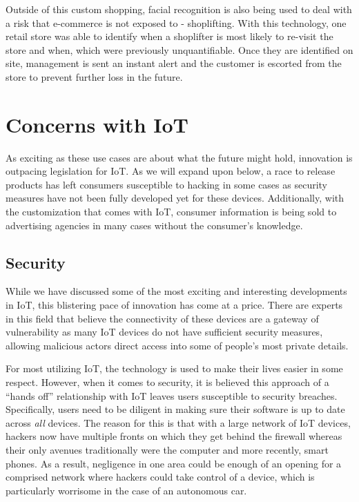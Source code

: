 \documentclass[sigconf]{acmart}
\begin{document}
Outside of this custom shopping, facial recognition is also being used to deal with a risk that e-commerce is not exposed to - shoplifting. With this technology, one retail store was able to identify when a shoplifter is most likely to re-visit the store and when, which were previously unquantifiable. Once they are identified on site, management is sent an instant alert and the customer is escorted from the store to prevent further loss in the future. 


\section{Concerns with IoT}
As exciting as these use cases are about what the future might hold, innovation is outpacing legislation for IoT. As we will expand upon below, a race to release products has left consumers susceptible to hacking in some cases as security measures have not been fully developed yet for these devices. Additionally, with the customization that comes with IoT, consumer information is being sold to advertising agencies in many cases without the consumer's knowledge. 

\subsection{Security}
While we have discussed some of the most exciting and interesting developments in IoT, this blistering pace of innovation has come at a price. There are experts in this field that believe the connectivity of these devices are a gateway of vulnerability as many IoT devices do not have sufficient security measures, allowing malicious actors direct access into some of people's most private details. 

For most utilizing IoT, the technology is used to make their lives easier in some respect. However, when it comes to security, it is believed this approach of a ``hands off'' relationship with IoT leaves users susceptible to security breaches. Specifically, users need to be diligent in making sure their software is up to date across \emph{all} devices. The reason for this is that with a large network of IoT devices, hackers now have multiple fronts on which they get behind the firewall whereas their only avenues traditionally were the computer and more recently, smart phones. As a result, negligence in one area could be enough of an opening for a comprised network where hackers could take control of a device, which is particularly worrisome in the case of an autonomous car. 
\end{document}
